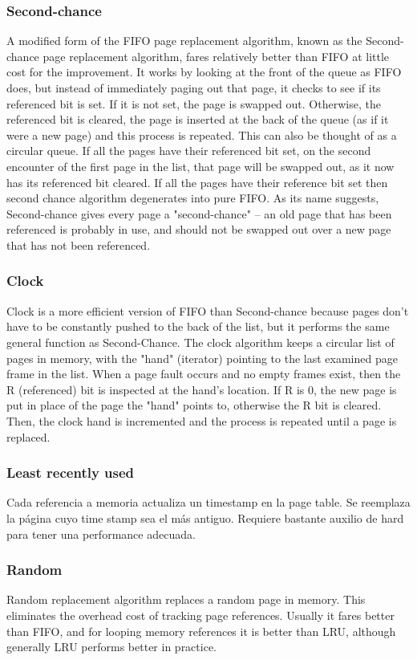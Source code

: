 \documentclass[a4paper, twoside]{article}
\begin{document}
\subsubsection{Second-chance}
A modified form of the FIFO page replacement algorithm, known as the Second-chance page replacement algorithm, fares relatively better than FIFO at little cost for the improvement. It works by looking at the front of the queue as FIFO does, but instead of immediately paging out that page, it checks to see if its referenced bit is set. If it is not set, the page is swapped out. Otherwise, the referenced bit is cleared, the page is inserted at the back of the queue (as if it were a new page) and this process is repeated. This can also be thought of as a circular queue. If all the pages have their referenced bit set, on the second encounter of the first page in the list, that page will be swapped out, as it now has its referenced bit cleared. If all the pages have their reference bit set then second chance algorithm degenerates into pure FIFO.
As its name suggests, Second-chance gives every page a "second-chance" – an old page that has been referenced is probably in use, and should not be swapped out over a new page that has not been referenced.

\subsubsection{Clock}
Clock is a more efficient version of FIFO than Second-chance because pages don't have to be constantly pushed to the back of the list, but it performs the same general function as Second-Chance. The clock algorithm keeps a circular list of pages in memory, with the "hand" (iterator) pointing to the last examined page frame in the list. When a page fault occurs and no empty frames exist, then the R (referenced) bit is inspected at the hand's location. If R is 0, the new page is put in place of the page the "hand" points to, otherwise the R bit is cleared. Then, the clock hand is incremented and the process is repeated until a page is replaced.

\subsubsection{Least recently used}
Cada referencia a memoria actualiza un timestamp en la page table. Se reemplaza la página cuyo time stamp sea el más antiguo. Requiere bastante auxilio de hard para tener una performance adecuada.

\subsubsection{Random}
Random replacement algorithm replaces a random page in memory. This eliminates the overhead cost of tracking page references. Usually it fares better than FIFO, and for looping memory references it is better than LRU, although generally LRU performs better in practice.
\end{document}
